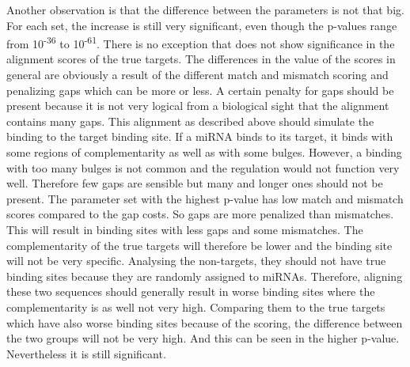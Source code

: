 \documentclass[12pt,  a4paper]{report}
\begin{document}
Another observation is that the difference between the parameters is not that big. For each set, the increase is still very significant, even though the p-values range from 10\textsuperscript{-36} to 10\textsuperscript{-61}. There is no exception that does not show significance in the alignment scores of the true targets. The differences in the value of the scores in general are obviously a result of the different match and mismatch scoring and penalizing gaps which can be more or less. A certain penalty for gaps should be present because it is not very logical from a biological sight that the alignment contains many gaps. This alignment as described above should simulate the binding to the target binding site. If a miRNA binds to its target, it binds with some regions of complementarity as well as with some bulges. However, a binding with too many bulges is not common and the regulation would not function very well. Therefore few gaps are sensible but many and longer ones should not be present.
The parameter set with the highest p-value has low match and mismatch scores compared to the gap costs. So gaps are more penalized than mismatches. This will result in binding sites with less gaps and some mismatches. The complementarity of the true targets will therefore be lower and the binding site will not be very specific. Analysing the non-targets, they should not have true binding sites because they are randomly assigned to miRNAs. Therefore, aligning these two sequences should generally result in worse binding sites where the complementarity is as well not very high. Comparing them to the true targets which have also worse binding sites because of the scoring, the difference between the two groups will not be very high. And this can be seen in the higher p-value. Nevertheless it is still significant. \\
\end{document}
